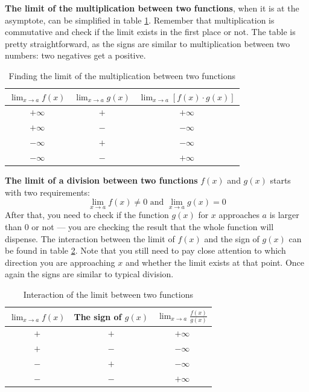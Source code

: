 \textbf{The limit of the multiplication between two functions}, when it is at the asymptote, can be simplified in table \ref{tab:m1}. Remember that multiplication is commutative and check if the limit exists in the first place or not. The table is pretty straightforward, as the signs are similar to multiplication between two numbers: two negatives get a positive.
\begin{table}
    \centering
    \begin{tabular}{|c|c|c|} \hline 
         $\lim_{x\to a}f(x)$ &$\lim_{x\to a}g(x)$ & $\lim_{x\to a}[f(x)\cdot g(x)]$\\ \hline 
         $+\infty$ & $+$ & $+\infty$\\ \hline 
         $+\infty$ & $-$ & $-\infty$\\ \hline 
         $-\infty$ & $+$ & $-\infty$\\ \hline 
         $-\infty$ & $-$ & $+\infty$\\ \hline
    \end{tabular}
    \caption{Finding the limit of the multiplication between two functions}
    \label{tab:m1}
\end{table}

\textbf{The limit of a division between two functions} $f(x)$ and $g(x)$ starts with two requirements:
\[
    \lim_{x\to a}f(x) \neq 0
    \text{ and }
    \lim_{x\to a}g(x) = 0
\]
After that, you need to check if the function $g(x)$ for $x$ approaches $a$ is larger than $0$ or not — you are checking the result that the whole function will dispense. The interaction between the limit of $f(x)$ and the sign of $g(x)$ can be found in table \ref{tab:m2}. Note that you still need to pay close attention to which direction you are approaching $x$ and whether the limit exists at that point. Once again the signs are similar to typical division.
\begin{table}
    \centering
    \begin{tabular}{|c|c|c|} \hline 
        $\lim_{x\to a}f(x)$ & The sign of $g(x)$ & $\lim_{x\to a}\frac{f(x)}{g(x)}$ \\ \hline 
        $+$ & $+$ & $+\infty$ \\ \hline 
        $+$ & $-$ & $-\infty$ \\ \hline 
        $-$ & $+$ & $-\infty$ \\ \hline 
        $-$ & $-$ & $+\infty$ \\ \hline
    \end{tabular}
    \caption{Interaction of the limit between two functions}
    \label{tab:m2}
\end{table}

